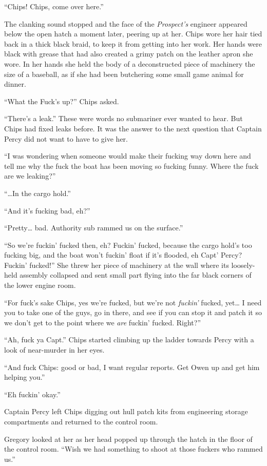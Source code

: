 \documentclass[]{article}
\begin{document}
\begin{multicols}{2}
``Chips! Chips, come over here.''

The clanking sound stopped and the face of the \emph{Prospect's}
engineer appeared below the open hatch a moment later, peering up at
her. Chips wore her hair tied back in a thick black braid, to keep it
from getting into her work. Her hands were black with grease that had
also created a grimy patch on the leather apron she wore. In her hands
she held the body of a deconstructed piece of machinery the size of a
baseball, as if she had been butchering some small game animal for
dinner.

``What the Fuck's up?'' Chips asked.

``There's a leak.'' These were words no submariner ever wanted to hear.
But Chips had fixed leaks before. It was the answer to the next question
that Captain Percy did not want to have to give her.

``I was wondering when someone would make their fucking way down here
and tell me why the fuck the boat has been moving so fucking funny.
Where the fuck are we leaking?''

``\ldots{}In the cargo hold.''

``And it's fucking bad, eh?''

``Pretty\ldots{} bad. Authority sub rammed us on the surface.''

``So we're fuckin' fucked then, eh? Fuckin' fucked, because the cargo
hold's too fucking big, and the boat won't fuckin' float if it's
flooded, eh Capt' Percy? Fuckin' fucked!'' She threw her piece of
machinery at the wall where its loosely-held assembly collapsed and sent
small part flying into the far black corners of the lower engine room.

``For fuck's sake Chips, yes we're fucked, but we're not \emph{fuckin'}
fucked, yet\ldots{} I need you to take one of the guys, go in there, and
see if you can stop it and patch it so we don't get to the point where
we \emph{are} fuckin' fucked. Right?''

``Ah, fuck ya Capt.'' Chips started climbing up the ladder towards Percy
with a look of near-murder in her eyes.

``And fuck Chips: good or bad, I want regular reports. Get Owen up and
get him helping you.''

``Eh fuckin' okay.''

Captain Percy left Chips digging out hull patch kits from engineering
storage compartments and returned to the control room.

Gregory looked at her as her head popped up through the hatch in the
floor of the control room. ``Wish we had something to shoot at those
fuckers who rammed us.''


\end{multicols}
\end{document}
